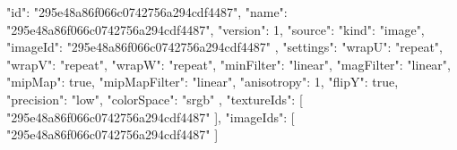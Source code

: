 {
  "id": "295e48a86f066c0742756a294cdf4487",
  "name": "295e48a86f066c0742756a294cdf4487",
  "version": 1,
  "source": {
    "kind": "image",
    "imageId": "295e48a86f066c0742756a294cdf4487"
  },
  "settings": {
    "wrapU": "repeat",
    "wrapV": "repeat",
    "wrapW": "repeat",
    "minFilter": "linear",
    "magFilter": "linear",
    "mipMap": true,
    "mipMapFilter": "linear",
    "anisotropy": 1,
    "flipY": true,
    "precision": "low",
    "colorSpace": "srgb"
  },
  "textureIds": [
    "295e48a86f066c0742756a294cdf4487"
  ],
  "imageIds": [
    "295e48a86f066c0742756a294cdf4487"
  ]
}
